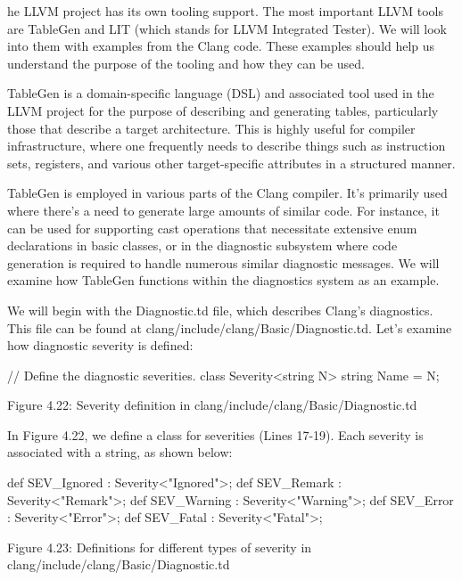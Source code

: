 he LLVM project has its own tooling support. The most important LLVM tools are TableGen and LIT (which stands for LLVM Integrated Tester). We will look into them with examples from the Clang code. These examples should help us understand the purpose of the tooling and how they can be used.


TableGen is a domain-specific language (DSL) and associated tool used in the LLVM project for the purpose of describing and generating tables, particularly those that describe a target architecture. This is highly useful for compiler infrastructure, where one frequently needs to describe things such as instruction sets, registers, and various other target-specific attributes in a structured manner.

TableGen is employed in various parts of the Clang compiler. It's primarily used where there's a need to generate large amounts of similar code. For instance, it can be used for supporting cast operations that necessitate extensive enum declarations in basic classes, or in the diagnostic subsystem where code generation is required to handle numerous similar diagnostic messages. We will examine how TableGen functions within the diagnostics system as an example.

We will begin with the Diagnostic.td file, which describes Clang's diagnostics. This file can be found at clang/include/clang/Basic/Diagnostic.td. Let's examine how diagnostic severity is defined:

\begin{shell}
// Define the diagnostic severities.
class Severity<string N> {
  string Name = N;
}
\end{shell}

\begin{center}
Figure 4.22: Severity definition in clang/include/clang/Basic/Diagnostic.td
\end{center}

In Figure 4.22, we define a class for severities (Lines 17-19). Each severity is associated with a string, as shown below:

\begin{shell}
def SEV_Ignored : Severity<"Ignored">;
def SEV_Remark  : Severity<"Remark">;
def SEV_Warning : Severity<"Warning">;
def SEV_Error   : Severity<"Error">;
def SEV_Fatal   : Severity<"Fatal">;
\end{shell}

\begin{center}
Figure 4.23: Definitions for different types of severity in clang/include/clang/Basic/Diagnostic.td
\end{center}

